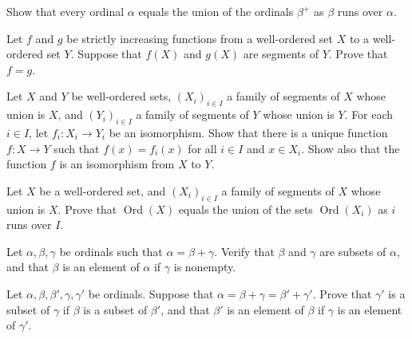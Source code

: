 \documentclass{article}
\begin{document}
\begin{exercise}
  \label{exe:qgdrw0j7}
  Show that every ordinal \(\alpha\) equals the union of the ordinals
  \(\beta^+\) as \(\beta\) runs over \(\alpha\).
\end{exercise}

\begin{exercise}
  \label{exe:owfnmkbo}
  Let \(f\) and \(g\) be strictly increasing functions from a
  well-ordered set \(X\) to a well-ordered set \(Y\).  Suppose that
  \(f(X)\) and \(g(X)\) are segments of \(Y\).  Prove that \(f = g\).
\end{exercise}

\begin{exercise}
  \label{exe:mybmksm1}
  Let \(X\) and \(Y\) be well-ordered sets, \((X_i)_{i \in I}\) a
  family of segments of \(X\) whose union is \(X\), and
  \((Y_i)_{i \in I}\) a family of segments of \(Y\) whose union is
  \(Y\).  For each \(i \in I\), let \(f_i : X_i \to Y_i\) be an
  isomorphism.  Show that there is a unique function \(f : X \to Y\)
  such that \(f(x) = f_i(x)\) for all \(i \in I\) and \(x \in X_i\).
  Show also that the function \(f\) is an isomorphism from \(X\) to
  \(Y\).
\end{exercise}

\begin{exercise}
  \label{exe:e0x1yv2c}
  Let \(X\) be a well-ordered set, and \((X_i)_{i \in I}\) a family of
  segments of \(X\) whose union is \(X\).  Prove that
  \(\operatorname{Ord}(X)\) equals the union of the sets
  \(\operatorname{Ord}(X_i)\) as \(i\) runs over \(I\).
\end{exercise}

\begin{exercise}
  \label{exe:v5ldoxkc}
  Let \(\alpha, \beta, \gamma\) be ordinals such that
  \(\alpha = \beta + \gamma\).  Verify that \(\beta\) and \(\gamma\)
  are subsets of \(\alpha\), and that \(\beta\) is an element of
  \(\alpha\) if \(\gamma\) is nonempty.
\end{exercise}

\begin{exercise}
  \label{exe:vwz0bksh}
  Let \(\alpha, \beta, \beta', \gamma, \gamma'\) be ordinals.  Suppose
  that \(\alpha = \beta + \gamma = \beta' + \gamma'\).  Prove that
  \(\gamma'\) is a subset of \(\gamma\) if \(\beta\) is a subset of
  \(\beta'\), and that \(\beta'\) is an element of \(\beta\) if
  \(\gamma\) is an element of \(\gamma'\).
\end{exercise}
\end{document}
